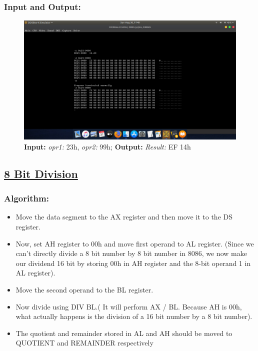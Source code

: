 \documentclass[12pt,a4paper]{article}
\begin{document}
\begin{flushleft}
\subsubsection*{\textbf{Input and Output:}}
\begin{figure}[h]
    \centering
    \includegraphics[trim = 100mm 70mm 100mm 80mm, clip, width = \textwidth]{Multiplication.png}
    \caption{ \textbf{Input:} \emph{opr1:} 23h, \emph{opr2:} 99h; 
              \textbf{Output:} \emph{Result:} EF 14h}
\end{figure}


\newpage
\subsection*{\textbf{\underline{8 Bit Division}}}

\subsubsection*{\textbf{Algorithm:}}
\begin{itemize}
    \item Move the data segment to the AX register and then move it to the DS register.
\item  Now, set AH register to 00h and move first operand to AL register. (Since we can’t directly divide a 8 bit number by 8 bit number in
8086, we now make our dividend 16 bit by storing 00h in AH register and the 8-bit operand 1 in AL register).
\item  Move the second operand to the BL register.
\item  Now divide using DIV BL.( It will perform AX / BL. Because AH is 00h, what actually happens is the division of a 16 bit number by a
8 bit number).
\item  The quotient and remainder stored in AL and AH should be moved to QUOTIENT and REMAINDER respectively
\end{itemize}


\end{flushleft}
\end{document}
